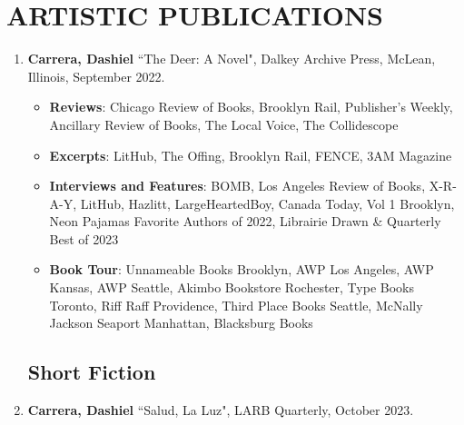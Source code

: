  \section{ARTISTIC PUBLICATIONS}
 \begin{enumerate}
 
 \subsection{Novels}
 \item \textbf{Carrera, Dashiel} ``The Deer: A Novel", Dalkey Archive Press, McLean, Illinois, September 2022. \\
 	\begin{itemize}
		\item \textbf{Reviews}: Chicago Review of Books, Brooklyn Rail, Publisher's Weekly, Ancillary Review of Books, The Local Voice, The Collidescope
		\item \textbf{Excerpts}: LitHub, The Offing, Brooklyn Rail, FENCE, 3AM Magazine
		\item \textbf{Interviews and Features}: BOMB, Los Angeles Review of Books, X-R-A-Y, LitHub, Hazlitt, LargeHeartedBoy, Canada Today, Vol 1 Brooklyn, Neon Pajamas Favorite Authors of 2022, Librairie Drawn \& Quarterly Best of 2023	
		\item \textbf{Book Tour}: Unnameable Books Brooklyn, AWP Los Angeles, AWP Kansas, AWP Seattle, Akimbo Bookstore Rochester, Type Books Toronto, Riff Raff Providence, Third Place Books Seattle, McNally Jackson Seaport Manhattan, Blacksburg Books	
	\end{itemize} 
 
 
\subsection{Short Fiction}
\item \textbf{Carrera, Dashiel} ``Salud, La Luz", LARB Quarterly, October 2023. \\



\end{enumerate}
